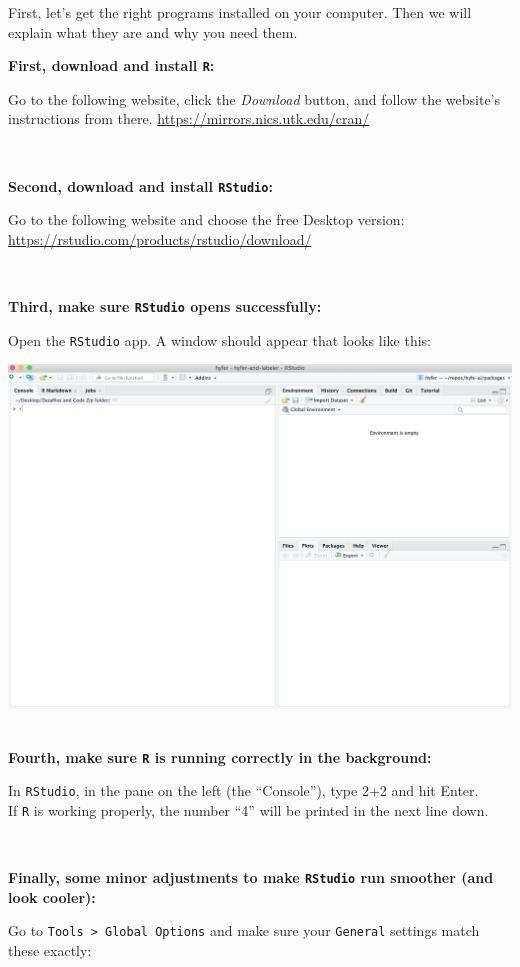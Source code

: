 \documentclass[]{book}
\begin{document}
First, let's get the right programs installed on your computer. Then we will explain what they are and why you need them.

\textbf{First, download and install \texttt{R}: }

Go to the following website, click the \emph{Download} button, and follow the website's instructions from there.
\url{https://mirrors.nics.utk.edu/cran/}

~

\textbf{Second, download and install \texttt{RStudio}:}

Go to the following website and choose the free Desktop version:
\url{https://rstudio.com/products/rstudio/download/}

~

\textbf{Third, make sure \texttt{RStudio} opens successfully:}

Open the \texttt{RStudio} app. A window should appear that looks like this:

\includegraphics{img/rstudio_firstopen.png}
~

\textbf{Fourth, make sure \texttt{R} is running correctly in the background:}

In \texttt{RStudio}, in the pane on the left (the ``Console''), type 2+2 and hit Enter.\\
If \texttt{R} is working properly, the number ``4'' will be printed in the next line down.

~

\textbf{Finally, some minor adjustments to make \texttt{RStudio} run smoother (and look cooler):}

Go to \texttt{Tools\ \textgreater{}\ Global\ Options} and make sure your \texttt{General} settings match these exactly:
\end{document}
